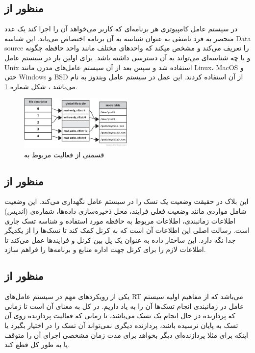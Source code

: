 \documentclass[10pt, a4paper]{article}
\begin{document}
\subsection{منظور از }

در سیستم عامل کامپیوتری هر برنامه‌ای که کاربر می‌خواهد آن را اجرا کند یک عدد
منحصر به فرد نامنفی به عنوان شناسه به آن برنامه اختصاص می‌یابد. این شناسه Data
source را تعریف می‌کند و مشخص میکند که واحد‌های مختلف مانند واحد حافظه چگونه و
با چه شناسه‌ای می‌تواند به آن دسترسی داشته باشد.  برای اولین
بار در سیستم عامل Unix استفاده شد و سپس بعد از آن سیستم عامل‌های مدرن مانند
Linux، MacOS و حتی Windows و BSD از آن استفاده کردند. این عمل در سیستم عامل
ویندوز به نام  می‌باشد \cite{filedescriptor}، شکل شماره
\ref{fig:fileDescriptor}.

\begin{figure}
    \centering
    \includegraphics[width=0.5\textwidth]{figs/file_descriptor.png}
    \caption{قسمتی از فعالیت مربوط به }
    \label{fig:fileDescriptor}
\end{figure}

\subsection{منظور از }

این بلاک در حقیقت وضعیت یک تسک را در سیستم عامل نگهداری می‌کند. این وضعیت شامل
مواردی مانند وضعیت فعلی فرایند، محل ذخیره‌سازی داده‌ها، شماره‌ی (اندیس) اطلاعات
زمانبندی، اطلاعات مربوط به حافظه مورد استفاده و شناسه تسک جاری است. رسالت اصلی
این اطلاعات آن است که به کرنل کمک کند تا تسک‌ها را از یکدیگر جدا نگه دارد. این
ساختار داده به عنوان یک پل بین کرنل و فرایند‌ها عمل می‌کند تا اطلاعات لازم را
برای کرنل جهت اداره منابع و برنامه‌ها را فراهم سازد.

\subsection{منظور از }

یکی از رویکرد‌های مهم در سیستم عامل‌های RT می‌باشد که از مفاهیم اولیه سیستم عامل
در زمانبندی انجام تسک‌ها آن را به یاد داریم. در کل به معنای آن است تا زمانی که
پردازنده در حال انجام یک تسک می‌باشد، تا زمانی که فعالیت پردازنده روی آن تسک به
پایان نرسیده باشد، پردازنده دیگری نمی‌تواند آن تسک را در اختیار بگیرد یا اینکه
برای مثلا پردازنده‌ای دیگر بخواهد برای مدت زمان مشخصی اجرای آن را متوقف یا به
طور کل قطع کند.
\end{document}
